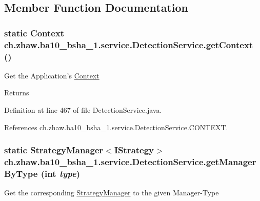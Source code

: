 \subsection{Member Function Documentation}
\hypertarget{classch_1_1zhaw_1_1ba10__bsha__1_1_1service_1_1DetectionService_a70a305c4eec817ca91cf711732f52e2a}{
\subsubsection[{getContext}]{\setlength{\rightskip}{0pt plus 5cm}static Context ch.zhaw.ba10\_\-bsha\_\-1.service.DetectionService.getContext ()}}
\label{classch_1_1zhaw_1_1ba10__bsha__1_1_1service_1_1DetectionService_a70a305c4eec817ca91cf711732f52e2a}
Get the Application's \hyperlink{}{Context}

\begin{DoxyReturn}{Returns}

\end{DoxyReturn}


Definition at line 467 of file DetectionService.java.

References ch.zhaw.ba10\_\-bsha\_\-1.service.DetectionService.CONTEXT.\hypertarget{classch_1_1zhaw_1_1ba10__bsha__1_1_1service_1_1DetectionService_a6ad4b4b98cda7ec8ebfb0420f93e03dd}{
\subsubsection[{getManagerByType}]{\setlength{\rightskip}{0pt plus 5cm}static StrategyManager$<${\bf IStrategy}$>$ ch.zhaw.ba10\_\-bsha\_\-1.service.DetectionService.getManagerByType (int {\em type})}}
\label{classch_1_1zhaw_1_1ba10__bsha__1_1_1service_1_1DetectionService_a6ad4b4b98cda7ec8ebfb0420f93e03dd}
Get the corresponding \hyperlink{}{StrategyManager} to the given Manager-\/Type


